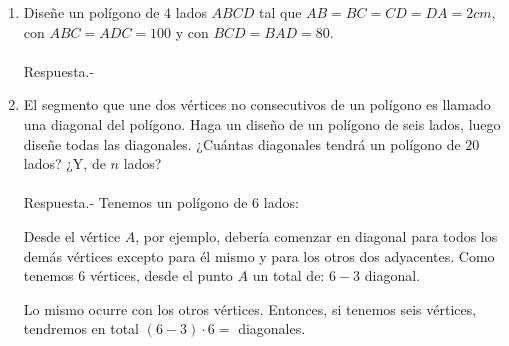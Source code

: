 \documentclass[10pt]{article}
\begin{document}
\begin{enumerate}
	\item Diseñe un polígono de 4 lados $ABCD$ tal que $AB=BC=CD=DA=2cm$, con $ABC=ADC=100$ y con $BCD=BAD=80$.\\\\
	Respuesta.-\; 

	\begin{center}
	\end{center}

	\item El segmento que une dos vértices no consecutivos de un polígono es llamado una diagonal del polígono. Haga un diseño de un polígono de seis lados, luego diseñe todas las diagonales. ¿Cuántas diagonales tendrá un polígono de $20$ lados? ¿Y, de $n$ lados?\\\\
	Respuesta.-\; Tenemos un polígono de 6 lados:
	\begin{center}
	\end{center}
	    Desde el vértice $A$, por ejemplo, debería comenzar en diagonal para todos los demás vértices excepto para él mismo y para los otros dos adyacentes. Como tenemos 6 vértices, desde el punto $A$ un total de: $6-3$ diagonal.

	\begin{center}
	\end{center}
	    Lo mismo ocurre con los otros vértices. Entonces, si tenemos seis vértices, tendremos en total $(6 - 3) · 6 =$ diagonales.


\end{enumerate}
\end{document}
